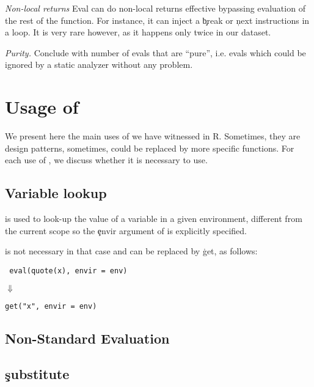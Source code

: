 \documentclass[screen,acmsmall]{acmart}
\newcommand{\mypara}[1]{\medskip\noindent\emph{#1}\xspace}
\begin{document}
\mypara{Non-local returns} Eval can do non-local returns effective bypassing
evaluation of the rest of the function. For instance, it can inject a \c{break} or \c{next} instructions in a loop. It is very rare however, as it happens only twice in our dataset. %

\mypara{Purity.} Conclude with number of evals that are ``pure'', i.e. evals
which could be ignored by a static analyzer without any problem.





\section{Usage of \eval}


We present here the main uses of \eval we have witnessed in R. Sometimes, they are design patterns, sometimes, \eval could be replaced by more specific functions. For each use of \eval, we discuss whether it is necessary to use.

\subsection{Variable lookup}

\eval is used to look-up the value of a variable in a given environment, different from the current scope so the \c{envir} argument of \eval is explicitly specified.


\eval is not necessary in that case and can be replaced by \c{get}, as follows:

\begin{lstlisting}
 eval(quote(x), envir = env)
\end{lstlisting}
$\Downarrow$
\begin{lstlisting}
get("x", envir = env)
\end{lstlisting}


\subsection{Non-Standard Evaluation} %

\subsection{\c{substitute}}
\end{document}
